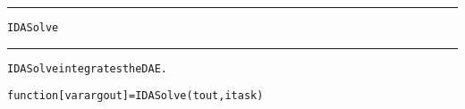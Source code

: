 \begin{samepage}
\hrule
\begin{center}
{\large \verb!IDASolve!}
\label{p:IDASolve}
\end{center}
\hrule\vspace{0.1in}



\begin{alltt}
IDASolve integrates the DAE.
\end{alltt}

\end{samepage}



\begin{samepage}


\begin{alltt}
function [varargout] = IDASolve(tout,itask) 
\end{alltt}

\end{samepage}



